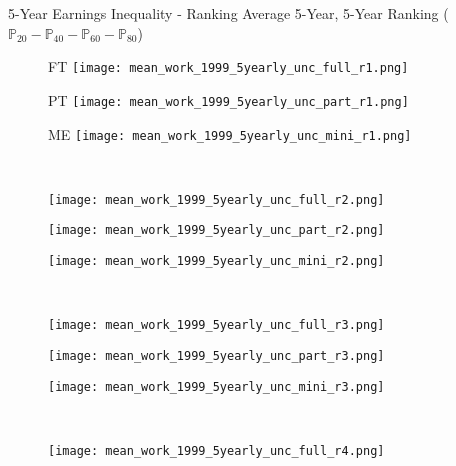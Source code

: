 \documentclass[hyperref={bookmarks=false}]{beamer}
\begin{document}
\begin{appendix}
\begin{frame}{5-Year Earnings Inequality - Ranking}
Average 5-Year, 5-Year Ranking ($\mathbb{P}_{20}-\mathbb{P}_{40}-\mathbb{P}_{60}-\mathbb{P}_{80}$)
\begin{figure}[!t]
\begin{minipage}[b]{0.15\textwidth}{FT}
\centering
\texttt{[image: mean\_work\_1999\_5yearly\_unc\_full\_r1.png]}
\end{minipage}
\begin{minipage}[b]{0.15\textwidth}{PT}
\centering
\texttt{[image: mean\_work\_1999\_5yearly\_unc\_part\_r1.png]}
\end{minipage}
\begin{minipage}[b]{0.15\textwidth}{ME}
\centering
\texttt{[image: mean\_work\_1999\_5yearly\_unc\_mini\_r1.png]}
\end{minipage}\\
\begin{minipage}[b]{0.15\textwidth}{}
\centering
\texttt{[image: mean\_work\_1999\_5yearly\_unc\_full\_r2.png]}
\end{minipage}
\begin{minipage}[b]{0.15\textwidth}{}
\centering
\texttt{[image: mean\_work\_1999\_5yearly\_unc\_part\_r2.png]}
\end{minipage}
\begin{minipage}[b]{0.15\textwidth}{}
\centering
\texttt{[image: mean\_work\_1999\_5yearly\_unc\_mini\_r2.png]}
\end{minipage}\\
\begin{minipage}[b]{0.15\textwidth}{}
\centering
\texttt{[image: mean\_work\_1999\_5yearly\_unc\_full\_r3.png]}
\end{minipage}
\begin{minipage}[b]{0.15\textwidth}{}
\centering
\texttt{[image: mean\_work\_1999\_5yearly\_unc\_part\_r3.png]}
\end{minipage}
\begin{minipage}[b]{0.15\textwidth}{}
\centering
\texttt{[image: mean\_work\_1999\_5yearly\_unc\_mini\_r3.png]}
\end{minipage}\\
\begin{minipage}[b]{0.15\textwidth}{}
\centering
\texttt{[image: mean\_work\_1999\_5yearly\_unc\_full\_r4.png]}
\end{minipage}
\begin{minipage}[b]{0.15\textwidth}{}

\end{minipage}
\end{figure}
\end{frame}
\end{appendix}
\end{document}
